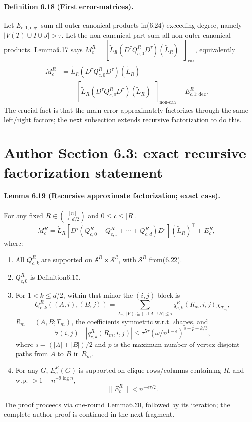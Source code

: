 \paragraph{Definition 6.18 (First error-matrices).} Let $E_{c,1;\mathrm{negl}}$ sum all outer-canonical products in(6.24) exceeding degree, namely $|V(T)\cup I\cup J|>\tau$. Let the non-canonical part sum all non-outer-canonical products. Lemma6.17 says $M_c^R=[\widetilde L_R(D^\tau Q_{c,0}^R D^\tau)(\widetilde L_R)^\top]_{\mathrm{can}}$, equivalently
\begin{align*}M_c^R&=\widetilde L_R(D^\tau Q_{c,0}^R D^\tau)(\widetilde L_R)^\top\\&\quad-[\widetilde L_R(D^\tau Q_{c,0}^R D^\tau)(\widetilde L_R)^\top]_{\mathrm{non\text{-}can}}-E^R_{c,1;\mathrm{deg}}.\tag{6.26}\end{align*}
The crucial fact is that the main error approximately factorizes through the same left/right factors; the next subsection extends recursive factorization to do this.
\section*{Author Section 6.3: exact recursive factorization statement}
\paragraph{Lemma 6.19 (Recursive approximate factorization; exact case).} For any fixed $R\in\binom{[n]}{\le d/2}$ and $0\le c\le|R|$,
\[M_c^R=\widetilde L_R[D^\tau(Q_{c,0}^R-Q_{c,1}^R+\cdots\pm Q_{c,d}^R)D^\tau](\widetilde L_R)^\top+E_c^R,\tag{6.27}\]
where:
\begin{enumerate}\item All $Q_{c,k}^R$ are supported on $\mathcal S^R\times\mathcal S^R$, with $\mathcal S^R$ from(6.22).
\item $Q_{c,0}^R$ is Definition6.15.
\item For $1<k\le d/2$, within that minor the $(i,j)$ block is
\[Q_{c,k}^R((A,i),(B,j))=\sum_{T_m:|V(T_m)\cup A\cup B|\le\tau}q_{c,k}^R(R_m,i,j)\chi_{T_m},\tag{6.28}\]
$R_m=(A,B;T_m)$, the coefficients symmetric w.r.t. shapes, and
\[\forall(i,j)\quad|q_{c,k}^R(R_m,i,j)|\le\tau^{5\tau}(\omega/n^{1-\epsilon})^{s-p+k/3},\tag{6.29}\]
where $s=(|A|+|B|)/2$ and $p$ is the maximum number of vertex-disjoint paths from $A$ to $B$ in $R_m$.
\item For any $G$, $E_c^R(G)$ is supported on clique rows/columns containing $R$, and w.p. $>1-n^{-9\log n}$,
\[\|E_c^R\|<n^{-\epsilon\tau/2}.\tag{6.30}\]
\end{enumerate}
The proof proceeds via one-round Lemma6.20, followed by its iteration; the complete author proof is continued in the next fragment.
